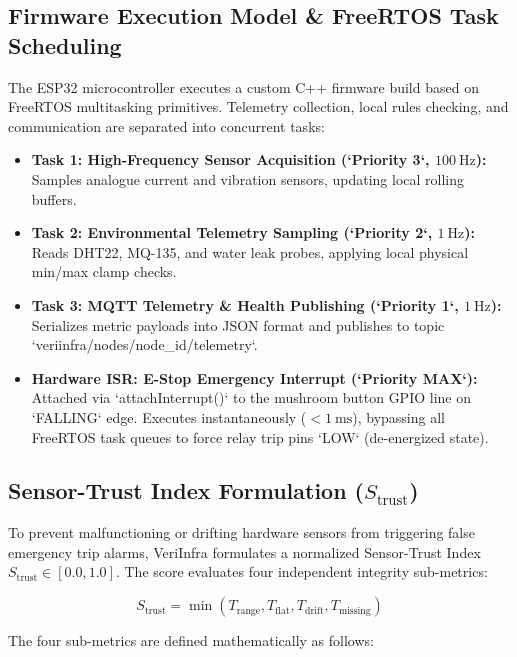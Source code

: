 \documentclass[conference]{IEEEtran}
\begin{document}
\subsection{Firmware Execution Model \& FreeRTOS Task Scheduling}
The ESP32 microcontroller executes a custom C++ firmware build based on FreeRTOS multitasking primitives. Telemetry collection, local rules checking, and communication are separated into concurrent tasks:

\begin{itemize}
    \item \textbf{Task 1: High-Frequency Sensor Acquisition (`Priority 3`, $100~\text{Hz}$):} Samples analogue current and vibration sensors, updating local rolling buffers.
    \item \textbf{Task 2: Environmental Telemetry Sampling (`Priority 2`, $1~\text{Hz}$):} Reads DHT22, MQ-135, and water leak probes, applying local physical min/max clamp checks.
    \item \textbf{Task 3: MQTT Telemetry \& Health Publishing (`Priority 1`, $1~\text{Hz}$):} Serializes metric payloads into JSON format and publishes to topic `veriinfra/nodes/{node_id}/telemetry`.
    \item \textbf{Hardware ISR: E-Stop Emergency Interrupt (`Priority MAX`):} Attached via `attachInterrupt()` to the mushroom button GPIO line on `FALLING` edge. Executes instantaneously ($< 1~\text{ms}$), bypassing all FreeRTOS task queues to force relay trip pins `LOW` (de-energized state).
\end{itemize}

\subsection{Sensor-Trust Index Formulation ($S_{\text{trust}}$)}
To prevent malfunctioning or drifting hardware sensors from triggering false emergency trip alarms, VeriInfra formulates a normalized Sensor-Trust Index $S_{\text{trust}} \in [0.0, 1.0]$. The score evaluates four independent integrity sub-metrics:

\begin{equation}
S_{\text{trust}} = \min\left( T_{\text{range}}, T_{\text{flat}}, T_{\text{drift}}, T_{\text{missing}} \right)
\end{equation}

The four sub-metrics are defined mathematically as follows:
\end{document}
